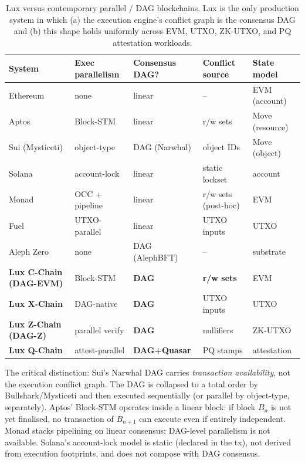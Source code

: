 \documentclass[11pt]{article}
\theoremstyle{definition}
\begin{document}
\begin{table}[h]
\centering
\small
\begin{tabular}{lllll}
\toprule
\textbf{System} & \textbf{Exec parallelism} & \textbf{Consensus DAG?} & \textbf{Conflict source} & \textbf{State model} \\
\midrule
Ethereum         & none    & linear & --                 & EVM (account) \\
Aptos            & Block-STM & linear & r/w sets          & Move (resource) \\
Sui (Mysticeti)  & object-type & DAG (Narwhal) & object IDs  & Move (object) \\
Solana           & account-lock & linear & static lockset  & account \\
Monad            & OCC + pipeline & linear & r/w sets (post-hoc) & EVM \\
Fuel             & UTXO-parallel & linear & UTXO inputs     & UTXO \\
Aleph Zero       & none    & DAG (AlephBFT) & --         & substrate \\
\midrule
\textbf{Lux C-Chain (DAG-EVM)} & Block-STM & \textbf{DAG}     & \textbf{r/w sets} & EVM \\
\textbf{Lux X-Chain}           & DAG-native & \textbf{DAG}    & UTXO inputs       & UTXO \\
\textbf{Lux Z-Chain (DAG-Z)}   & parallel verify & \textbf{DAG} & nullifiers       & ZK-UTXO \\
\textbf{Lux Q-Chain}           & attest-parallel & \textbf{DAG+Quasar} & PQ stamps & attestation \\
\bottomrule
\end{tabular}
\caption{Lux versus contemporary parallel / DAG blockchains. Lux is the
only production system in which (a) the execution engine's conflict graph
is the consensus DAG and (b) this shape holds uniformly across EVM,
UTXO, ZK-UTXO, and PQ attestation workloads.}
\label{tab:contemporaries}
\end{table}

The critical distinction: Sui's Narwhal DAG carries \emph{transaction
availability}, not the execution conflict graph. The DAG is collapsed to a
total order by Bullshark/Mysticeti and then executed sequentially (or
parallel by object-type, separately). Aptos' Block-STM operates inside a
linear block: if block $B_n$ is not yet finalised, no transaction of
$B_{n+1}$ can execute even if entirely independent. Monad stacks
pipelining on linear consensus; DAG-level parallelism is not available.
Solana's account-lock model is static (declared in the tx), not derived
from execution footprints, and does not compose with DAG consensus.
\end{document}
